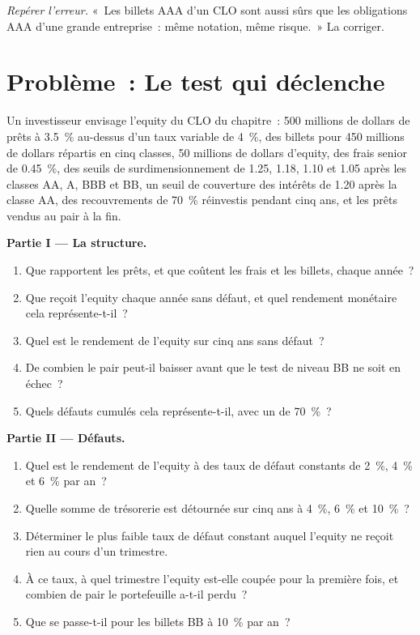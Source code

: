 \begin{exercise}[$\star\star\star$]\label{exo:m2:loans-clos-and-securitisation:8}
\emph{Repérer l'erreur.} «~Les billets AAA d'un CLO sont aussi sûrs que les obligations AAA d'une
grande entreprise~: même notation, même risque.~» La corriger.
\end{exercise}

\section{Problème~: Le test qui déclenche}

\begin{problem}\label{pb:m2:loans-clos-and-securitisation:1}
Un investisseur envisage l'equity du CLO du chapitre~: 500 millions de dollars de prêts à 3.5~\%
au-dessus d'un taux variable de 4~\%, des billets pour 450 millions de dollars répartis en cinq classes, 50 millions de dollars
d'equity, des frais senior de 0.45~\%, des seuils de surdimensionnement de 1.25, 1.18, 1.10 et
1.05 après les classes AA, A, BBB et BB, un seuil de couverture des intérêts de 1.20 après
la classe AA, des recouvrements de 70~\% réinvestis pendant cinq ans, et les prêts vendus au pair
à la fin.

\medskip\noindent\textbf{Partie I --- La structure.}
\begin{enumerate}
\item Que rapportent les prêts, et que coûtent les frais et les billets, chaque année~?
\item Que reçoit l'equity chaque année sans défaut, et quel
rendement monétaire cela représente-t-il~?
\item Quel est le rendement de l'equity sur cinq ans sans défaut~?
\item De combien le pair peut-il baisser avant que le test de niveau BB ne soit en échec~?
\item Quels défauts cumulés cela représente-t-il, avec un  de 70~\%~?
\end{enumerate}

\medskip\noindent\textbf{Partie II --- Défauts.}
\begin{enumerate}[resume]
\item Quel est le rendement de l'equity à des taux de défaut constants de 2~\%, 4~\% et 6~\% par an~?
\item Quelle somme de trésorerie est détournée sur cinq ans à 4~\%, 6~\% et 10~\%~?
\item Déterminer le plus faible taux de défaut constant auquel l'equity ne reçoit rien
au cours d'un trimestre.
\item À ce taux, à quel trimestre l'equity est-elle coupée pour la première fois, et combien de pair
le portefeuille a-t-il perdu~?
\item Que se passe-t-il pour les billets BB à 10~\% par an~?
\end{enumerate}


\end{problem}
